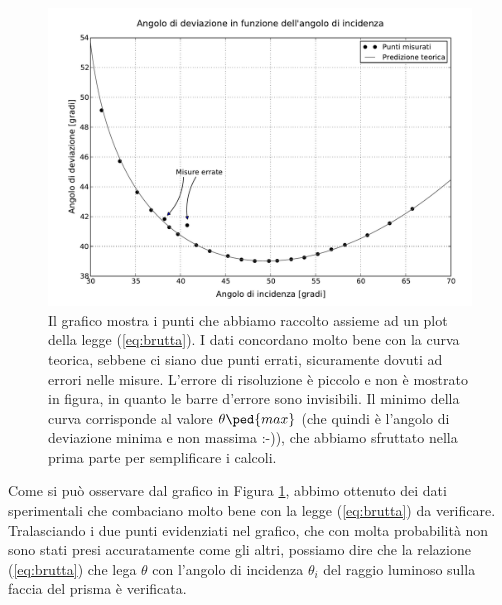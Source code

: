 \begin{figure}[h]
    \includegraphics[width=16cm]{graph.pdf}
    \caption{Il grafico mostra i punti che abbiamo raccolto assieme ad un plot della legge (\ref{eq:brutta}). I dati concordano
    molto bene con la curva teorica, sebbene ci siano due punti errati, sicuramente dovuti ad errori nelle misure. L'errore di
    risoluzione è piccolo e non è mostrato in figura, in quanto le barre d'errore sono invisibili. Il minimo della curva corrisponde al valore $\theta\ped{max}$ (che quindi è l'angolo di deviazione minima e non massima :-)), che abbiamo sfruttato nella prima parte per semplificare i calcoli. }
    \label{fig:dev}
\end{figure}

Come si può osservare dal grafico in Figura \ref{fig:dev}, abbimo ottenuto dei dati sperimentali che combaciano molto bene con la legge (\ref{eq:brutta}) da verificare. Tralasciando i due punti evidenziati nel grafico, che con molta probabilità non sono stati presi accuratamente come gli altri, possiamo dire che la relazione (\ref{eq:brutta}) che lega $\theta$ con l'angolo di incidenza $\theta_i$ del raggio luminoso sulla faccia del prisma è verificata.
